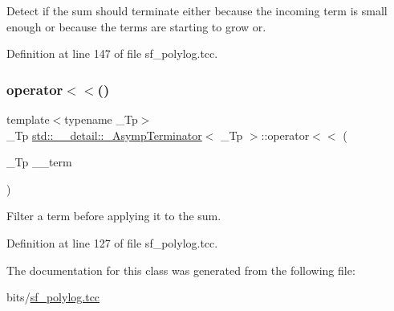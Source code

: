 Detect if the sum should terminate either because the incoming term is small enough or because the terms are starting to grow or. 



Definition at line 147 of file sf\+\_\+polylog.\+tcc.

\mbox{\label{classstd_1_1____detail_1_1__AsympTerminator_a7299b3abc814127eba98d16f6ac7d4e1}} 
\subsubsection{\texorpdfstring{operator$<$$<$()}{operator<<()}}
{\footnotesize\ttfamily template$<$typename \+\_\+\+Tp$>$ \\
\+\_\+\+Tp \hyperlink{classstd_1_1____detail_1_1__AsympTerminator}{std\+::\+\_\+\+\_\+detail\+::\+\_\+\+Asymp\+Terminator}$<$ \+\_\+\+Tp $>$\+::operator$<$$<$ (\begin{DoxyParamCaption}\item[{\+\_\+\+Tp}]{\+\_\+\+\_\+term }\end{DoxyParamCaption})\hspace{0.3cm}{\ttfamily [inline]}}



Filter a term before applying it to the sum. 



Definition at line 127 of file sf\+\_\+polylog.\+tcc.



The documentation for this class was generated from the following file\+:\begin{DoxyCompactItemize}
\item 
bits/\hyperlink{sf__polylog_8tcc}{sf\+\_\+polylog.\+tcc}\end{DoxyCompactItemize}
